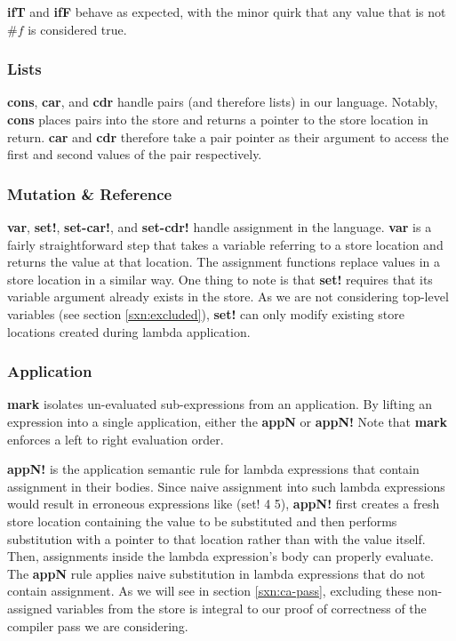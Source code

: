 \textbf{ifT} and \textbf{ifF} behave as expected, with the minor quirk that any value that is not $\#f$ is considered true.

\subsubsection{Lists}\label{sxn:sem_lists}
\textbf{cons}, \textbf{car}, and \textbf{cdr} handle pairs (and therefore lists) in our language. Notably, \textbf{cons} places pairs into the store and returns a pointer to the store location in return. \textbf{car} and \textbf{cdr} therefore take a pair pointer as their argument to access the first and second values of the pair respectively.

\subsubsection{Mutation \& Reference}\label{sxn:sem_assign}
\textbf{var}, \textbf{set!}, \textbf{set-car!}, and \textbf{set-cdr!} handle assignment in the language. \textbf{var} is a fairly straightforward step that takes a variable referring to a store location and returns the value at that location. The assignment functions replace values in a store location in a similar way. One thing to note is that \textbf{set!} requires that its variable argument already exists in the store. As we are not considering top-level variables (see section \ref{sxn:excluded}), \textbf{set!} can only modify existing store locations created during lambda application.

\subsubsection{Application}\label{sxn:sem_app}
\textbf{mark} isolates un-evaluated sub-expressions from an application. By lifting an expression into a single application, either the \textbf{appN} or \textbf{appN!} Note that \textbf{mark} enforces a left to right evaluation order.

\textbf{appN!} is the application semantic rule for lambda expressions that contain assignment in their bodies. Since naive assignment into such lambda expressions would result in erroneous expressions like (set! 4 5), \textbf{appN!} first creates a fresh store location containing the value to be substituted and then performs substitution with a pointer to that location rather than with the value itself. Then, assignments inside the lambda expression's body can properly evaluate. The \textbf{appN} rule applies naive substitution in lambda expressions that do not contain assignment. As we will see in section \ref{sxn:ca-pass}, excluding these non-assigned variables from the store is integral to our proof of correctness of the compiler pass we are considering.

